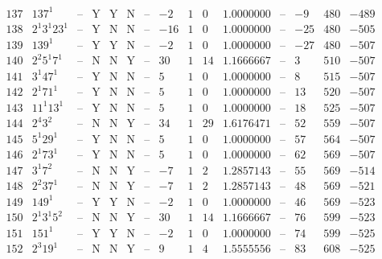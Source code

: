 \documentclass[11pt,reqno,a4letter]{article}
\numberwithin{figure}{section}
\numberwithin{table}{section}
\theoremstyle{plain}
\numberwithin{theorem}{section}
\theoremstyle{definition}
\begin{document}
\begin{table}[h!]
\begin{equation*}
{\begin{array}{|cc|c|ccc|c|c|ccc|c|ccc}
 137 & 137^1 & \text{--} & \text{Y} & \text{Y} & \text{N} & \text{--} & -2 & 1 & 0 & 1.0000000 & \text{--} & -9 & 480 & -489 \\
 138 & 2^1 3^1 23^1 & \text{--} & \text{Y} & \text{N} & \text{N} & \text{--} & -16 & 1 & 0 & 1.0000000 & \text{--} & -25 & 480 & -505 \\
 139 & 139^1 & \text{--} & \text{Y} & \text{Y} & \text{N} & \text{--} & -2 & 1 & 0 & 1.0000000 & \text{--} & -27 & 480 & -507 \\
 140 & 2^2 5^1 7^1 & \text{--} & \text{N} & \text{N} & \text{Y} & \text{--} & 30 & 1 & 14 & 1.1666667 & \text{--} & 3 & 510 & -507 \\
 141 & 3^1 47^1 & \text{--} & \text{Y} & \text{N} & \text{N} & \text{--} & 5 & 1 & 0 & 1.0000000 & \text{--} & 8 & 515 & -507 \\
 142 & 2^1 71^1 & \text{--} & \text{Y} & \text{N} & \text{N} & \text{--} & 5 & 1 & 0 & 1.0000000 & \text{--} & 13 & 520 & -507 \\
 143 & 11^1 13^1 & \text{--} & \text{Y} & \text{N} & \text{N} & \text{--} & 5 & 1 & 0 & 1.0000000 & \text{--} & 18 & 525 & -507 \\
 144 & 2^4 3^2 & \text{--} & \text{N} & \text{N} & \text{Y} & \text{--} & 34 & 1 & 29 & 1.6176471 & \text{--} & 52 & 559 & -507 \\
 145 & 5^1 29^1 & \text{--} & \text{Y} & \text{N} & \text{N} & \text{--} & 5 & 1 & 0 & 1.0000000 & \text{--} & 57 & 564 & -507 \\
 146 & 2^1 73^1 & \text{--} & \text{Y} & \text{N} & \text{N} & \text{--} & 5 & 1 & 0 & 1.0000000 & \text{--} & 62 & 569 & -507 \\
 147 & 3^1 7^2 & \text{--} & \text{N} & \text{N} & \text{Y} & \text{--} & -7 & 1 & 2 & 1.2857143 & \text{--} & 55 & 569 & -514 \\
 148 & 2^2 37^1 & \text{--} & \text{N} & \text{N} & \text{Y} & \text{--} & -7 & 1 & 2 & 1.2857143 & \text{--} & 48 & 569 & -521 \\
 149 & 149^1 & \text{--} & \text{Y} & \text{Y} & \text{N} & \text{--} & -2 & 1 & 0 & 1.0000000 & \text{--} & 46 & 569 & -523 \\
 150 & 2^1 3^1 5^2 & \text{--} & \text{N} & \text{N} & \text{Y} & \text{--} & 30 & 1 & 14 & 1.1666667 & \text{--} & 76 & 599 & -523 \\
 151 & 151^1 & \text{--} & \text{Y} & \text{Y} & \text{N} & \text{--} & -2 & 1 & 0 & 1.0000000 & \text{--} & 74 & 599 & -525 \\
 152 & 2^3 19^1 & \text{--} & \text{N} & \text{N} & \text{Y} & \text{--} & 9 & 1 & 4 & 1.5555556 & \text{--} & 83 & 608 & -525 \\

\end{array}}
\end{equation*}
\end{table}
\end{document}
